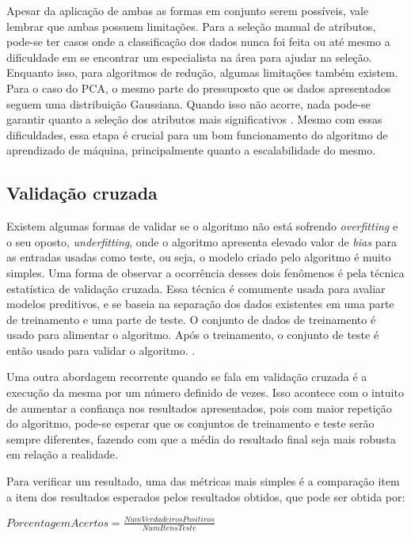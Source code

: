 Apesar da aplicação de ambas as formas em conjunto serem possíveis, vale lembrar
que ambas possuem limitações. Para a seleção manual de atributos, pode-se ter
casos onde a classificação dos dados nunca foi feita ou até mesmo a dificuldade
em se encontrar um especialista na área para ajudar na seleção. Enquanto isso,
para algoritmos de redução, algumas limitações também existem. Para o caso do
PCA, o mesmo parte do pressuposto que os dados apresentados seguem uma
distribuição Gaussiana. Quando isso não acorre, nada pode-se garantir quanto a
seleção dos atributos mais significativos \cite{amatriain2011data}. Mesmo com
essas dificuldades, essa etapa é crucial para um bom funcionamento do algoritmo
de aprendizado de máquina, principalmente quanto a escalabilidade do mesmo.


\subsection{Validação cruzada}\label{subsec:validacao_cruzada}

Existem algumas formas de validar se o algoritmo não está sofrendo \textit{overfitting}
e o seu oposto, \textit{underfitting}, onde o algoritmo apresenta elevado valor
de \textit{bias} para as entradas usadas como teste, ou seja, o modelo criado
pelo algoritmo é muito simples. Uma forma de observar a ocorrência desses dois
fenômenos é pela técnica estatística de validação cruzada. Essa técnica é
comumente usada para avaliar modelos preditivos, e se baseia na separação dos
dados existentes em uma parte de treinamento e uma parte de teste. O conjunto de
dados de treinamento é usado para alimentar o algoritmo. Após o treinamento,
o conjunto de teste é então usado para validar o algoritmo. \cite{araujo2011apprecommender}.

Uma outra abordagem recorrente quando se fala em validação cruzada é a execução
da mesma por um número definido de vezes. Isso acontece com o intuito de
aumentar a confiança nos resultados apresentados, pois com maior repetição do
algoritmo, pode-se esperar que os conjuntos de treinamento e teste serão sempre
diferentes, fazendo com que a média do resultado final seja mais robusta em
relação a realidade.

Para verificar um resultado, uma das métricas mais simples é a comparação item a
item dos resultados esperados pelos resultados obtidos, que pode ser obtida por:

$PorcentagemAcertos = \frac{NumVerdadeirosPositivos}{NumItensTeste}$

